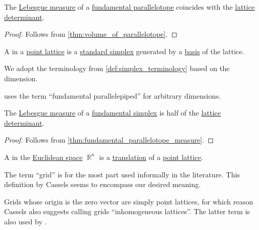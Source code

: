 \begin{proposition}\label{thm:fundamental_parallelotope_measure}
  The \hyperref[def:lebesgue_measure]{Lebesgue measure} of a \hyperref[def:fundamental_parallelotope]{fundamental parallelotope} coincides with the \hyperref[def:point_lattice_determinant]{lattice determinant}.
\end{proposition}
\begin{proof}
  Follows from \cref{thm:volume_of_parallelotope}.
\end{proof}

\begin{definition}\label{def:fundamental_simplex}
  A  in a \hyperref[def:point_lattice]{point lattice} is a \hyperref[def:standard_simplex]{standard simplex} generated by a \hyperref[def:point_lattice_basis]{basis} of the lattice.

  We adopt the terminology from \cref{def:simplex_terminology} based on the dimension.
\end{definition}
\begin{comments}
  \item {} uses the term \enquote{fundamental parallelepiped} for arbitrary dimensions.
\end{comments}

\begin{proposition}\label{thm:fundamental_simplex_measure}
  The \hyperref[def:lebesgue_measure]{Lebesgue measure} of a \hyperref[def:fundamental_simplex]{fundamental simplex} is half of the \hyperref[def:point_lattice_determinant]{lattice determinant}.
\end{proposition}
\begin{proof}
  Follows from \cref{thm:fundamental_parallelotope_measure}.
\end{proof}

\begin{definition}\label{def:euclidean_space_grid}
  A  in the \hyperref[def:euclidean_space]{Euclidean space} \( \BbbR^n \) is a \hyperref[def:rigid_motion/translation]{translation} of a \hyperref[def:point_lattice]{point lattice}.
\end{definition}
\begin{comments}
  \item The term \enquote{grid} is for the most part used informally in the literature. This definition by Cassels seems to encompass our desired meaning.

  \item Grids whose origin is the zero vector are simply point lattices, for which reason Cassels also suggests calling grids \enquote{inhomogeneous lattices}. The latter term is also used by .
\end{comments}

